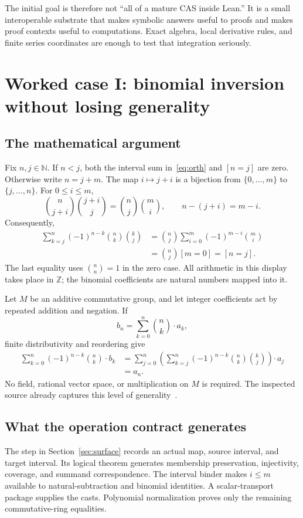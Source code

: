 \documentclass[11pt,a4paper]{article}
\newcommand{\code}[1]{\texttt{\detokenize{#1}}}
\newcommand{\N}{\mathbb N}
\newcommand{\Z}{\mathbb Z}
\theoremstyle{definition}
\theoremstyle{remark}
\begin{document}
The initial goal is therefore not ``all of a mature CAS inside Lean.'' It is a small interoperable substrate that makes symbolic answers useful to proofs and makes proof contexts useful to computations. Exact algebra, local derivative rules, and finite series coordinates are enough to test that integration seriously.

\section{Worked case I: binomial inversion without losing generality}\label{sec:binomial}
\subsection{The mathematical argument}
Fix $n,j\in\N$. If $n<j$, both the interval sum in~\eqref{eq:orth} and $[n=j]$ are zero. Otherwise write $n=j+m$. The map $i\mapsto j+i$ is a bijection from $\{0,\ldots,m\}$ to $\{j,\ldots,n\}$. For $0\le i\le m$,
\[
\binom n{j+i}\binom{j+i}j=\binom nj\binom mi,
\qquad n-(j+i)=m-i.
\]
Consequently,
\begin{align*}
\sum_{k=j}^{n}(-1)^{n-k}\binom nk\binom kj
 &=\binom nj\sum_{i=0}^{m}(-1)^{m-i}\binom mi\\
 &=\binom nj[m=0]=[n=j].
\end{align*}
The last equality uses $\binom nn=1$ in the zero case. All arithmetic in this display takes place in $\Z$; the binomial coefficients are natural numbers mapped into it.

Let $M$ be an additive commutative group, and let integer coefficients act by repeated addition and negation. If
\[
b_n=\sum_{k=0}^{n}\binom nk\,\boldsymbol{\cdot}\,a_k,
\]
finite distributivity and reordering give
\begin{align*}
\sum_{k=0}^{n}(-1)^{n-k}\binom nk\,\boldsymbol{\cdot}\,b_k
&=\sum_{j=0}^{n}
 \left(\sum_{k=j}^{n}(-1)^{n-k}\binom nk\binom kj\right)
 \boldsymbol{\cdot}\,a_j\\
&=a_n.
\end{align*}
No field, rational vector space, or multiplication on $M$ is required. The inspected source already captures this level of generality~\cite{binomial}.

\subsection{What the operation contract generates}
The \code{reindex} step in Section~\ref{sec:surface} records an actual map, source interval, and target interval. Its logical theorem generates membership preservation, injectivity, coverage, and summand correspondence. The interval binder makes $i\le m$ available to natural-subtraction and binomial identities. A scalar-transport package supplies the casts. Polynomial normalization proves only the remaining commutative-ring equalities.
\end{document}
